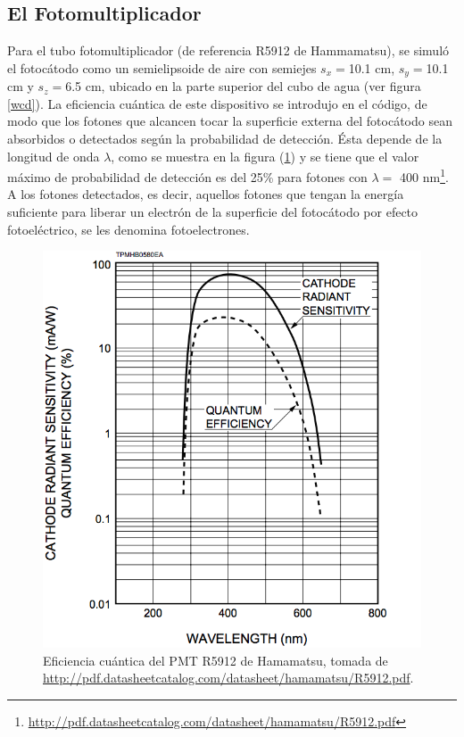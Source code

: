 \documentclass[12pt,oneside,openany,letter]{book}
\begin{document}
\subsection{El Fotomultiplicador}
Para el tubo fotomultiplicador (de referencia R5912 de Hammamatsu), se simuló el fotocátodo como un semielipsoide de aire con semiejes $s_x=$10.1 cm, $s_y=$10.1 cm y $s_z=$6.5 cm, ubicado en la parte superior del cubo de agua (ver figura \ref{wcd}). La eficiencia cuántica de este dispositivo se introdujo en el código, de modo que los fotones que alcancen tocar la superficie externa del fotocátodo sean absorbidos o detectados según la probabilidad de detección. \'Esta depende de la longitud de onda $\lambda$, como se muestra en la figura (\ref{QEPMT}) y se tiene que el valor máximo de probabilidad de detección es del 25\% para fotones con $\lambda =$ 400 nm\footnote{\url{http://pdf.datasheetcatalog.com/datasheet/hamamatsu/R5912.pdf}}. A los fotones detectados, es decir, aquellos fotones que tengan la energía suficiente para liberar un electrón de la superficie del fotoc\'atodo por efecto fotoeléctrico, se les denomina fotoelectrones.
\begin{figure}[h!]
    \centering
        \includegraphics[scale=0.35]{QEPMT.png}
   \caption[Eficiencia cuántica del PMT R5912 de Hamamatsu]{Eficiencia cuántica del PMT R5912 de Hamamatsu, tomada de \url{http://pdf.datasheetcatalog.com/datasheet/hamamatsu/R5912.pdf}.}\label{QEPMT}
\end{figure}
\end{document}
